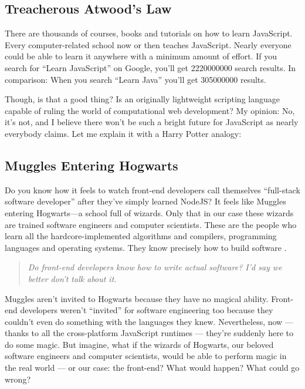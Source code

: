 \documentclass[10pt]{article}
\begin{document}
\begin{sloppypar}
  \subsection{Treacherous Atwood’s Law}
  \label{sec:atwood-law}

  There are thousands of courses, books and tutorials on how to learn JavaScript. Every computer-related school now or then teaches JavaScript. Nearly everyone could be able to learn it anywhere with a minimum amount of effort. If you search for “Learn JavaScript” on Google, you’ll get \num{2220000000} search results. In comparison: When you search “Learn Java” you’ll get \num{305000000} results.

  Though, is that a good thing? Is an originally lightweight scripting language capable of ruling the world of computational web development? My opinion: No, it’s not, and I believe there won’t be such a bright future for JavaScript as nearly everybody claims. Let me explain it with a Harry Potter analogy:

  \subsection{Muggles Entering Hogwarts}
  \label{sec:muggles}

  Do you know how it feels to watch front-end developers call themselves “full-stack software developer” after they’ve simply learned NodeJS? It feels like Muggles entering Hogwarts—a school full of wizards. Only that in our case these wizards are trained software engineers and computer scientists. These are the people who learn all the hardcore-implemented algorithms and compilers, programming languages and operating systems. They know precisely how to build software \citep{might_what_2011}.

  \begin{quote}
    \emph{Do front-end developers know how to write actual software? I’d say we better don’t talk about it.}
  \end{quote}

  Muggles aren’t invited to Hogwarts because they have no magical ability. Front-end developers weren’t “invited” for software engineering too because they couldn’t even do something with the languages they knew. Nevertheless, now — thanks to all the cross-platform JavaScript runtimes — they’re suddenly here to do some magic. But imagine, what if the wizards of Hogwarts, our beloved software engineers and computer scientists, would be able to perform magic in the real world — or our case: the front-end? What would happen? What could go wrong?


\end{sloppypar}
\end{document}
